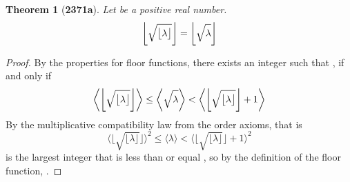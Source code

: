 \documentclass[preview]{standalone}
\newtheorem{theorem}{Theorem}
\begin{document}
\begin{theorem}[\textbf{2371a}]
    Let \bm{$\lambda$} be a positive real number. 
    \begin{equation*}
        \relax{
            \bigg \lfloor 
                \sqrt{ \strut \big \lfloor \lambda \big \rfloor } 
            \bigg \rfloor 
                = 
            \bigg \lfloor \sqrt{ \strut \lambda} \bigg \rfloor
        }
    \end{equation*}
\end{theorem}


\begin{proof}
    By the properties for floor functions,
    there exists an integer 
    \bm{$
        \big \lfloor \sqrt{ 
            \lfloor \lambda \rfloor 
        } \big \rfloor
    $} such that 
    \bm{$
        \big \lfloor \sqrt{ \lambda} \big \rfloor
            = 
        \big \lfloor \sqrt{ 
            \lfloor \lambda \rfloor 
        } \big \rfloor 
    $},
    if and only if
    \begin{equation*}
        \bigg \langle 
            \bigg \lfloor 
                \sqrt{ 
                    \big \lfloor \lambda \big \rfloor
                }
            \bigg \rfloor
        \bigg \rangle
            \leq
        \bigg \langle
            \sqrt{ \strut \lambda }
        \bigg \rangle
            <
        \bigg \langle 
            \bigg \lfloor 
                \sqrt{ 
                    \big \lfloor \lambda \big \rfloor
                }
            \bigg \rfloor
                +
            1
        \bigg \rangle
    \end{equation*}
    By the multiplicative compatibility law from the order axioms, that is
    \begin{equation*}
        \bigg \langle 
            \bigg \lfloor 
                \sqrt{ 
                    \big \lfloor \lambda \big \rfloor
                }
            \bigg \rfloor
        \bigg \rangle
            ^2
            \leq
        \bigg \langle
            \lambda
        \bigg \rangle
            <
        \bigg \langle 
            \bigg \lfloor 
                \sqrt{ 
                    \big \lfloor \lambda \big \rfloor
                }
            \bigg \rfloor
                +
            1
        \bigg \rangle
        ^2
    \end{equation*}
    \bm{$\big \lfloor \lambda \big \rfloor$} 
    is the largest integer that is less than or equal \bm{$\lambda$},
    so by the definition of the floor function, 
    \bm{$\big \lfloor \lambda \big \rfloor \leq \lambda$}. 

\end{proof}
\end{document}
